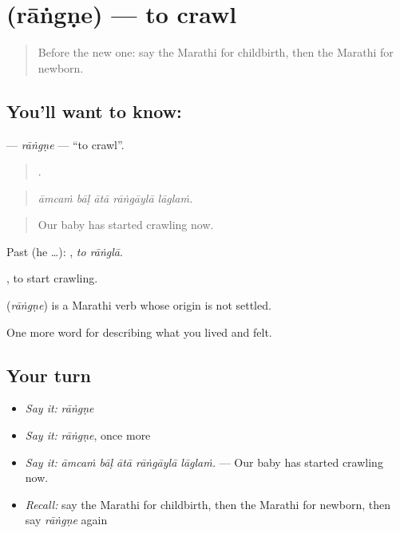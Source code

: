 \section[\texorpdfstring{\mr{रांगणे} (rāṅgṇe)}{रांगणे (rāṅgṇe)}]{ (rāṅgṇe) — to crawl}

\label{lesson:MR-C499-rangne}



\begin{quote}
Before the new one: say the Marathi for childbirth, then the Marathi for newborn.
\end{quote}

\subsection*{You'll want to know: }
\textbf{} — \emph{rāṅgṇe} — \textquotedblleft{}to crawl\textquotedblright{}.

\begin{quote}
    .
\end{quote}

\begin{quote}
\emph{āmcaṁ bāḷ ātā rāṅgāylā lāglaṁ.}
\end{quote}

\begin{quote}
Our baby has started crawling now.
\end{quote}

Past (he …):  , \emph{to rāṅglā}.

 , to start crawling.

\begin{cousinweb}
\textbf{} (\emph{rāṅgṇe}) is a Marathi verb whose origin is not settled.
\end{cousinweb}

\begin{grammarlens}[title={What you've built}]
One more word for describing what you lived and felt.
\end{grammarlens}

\subsection*{Your turn}
\begin{itemize}
\raggedright
  \item \emph{Say it:} \emph{rāṅgṇe}
  \item \emph{Say it:} \emph{rāṅgṇe}, once more
  \item \emph{Say it:} \emph{āmcaṁ bāḷ ātā rāṅgāylā lāglaṁ.} — Our baby has started crawling now.
  \item \emph{Recall:} say the Marathi for childbirth, then the Marathi for newborn, then say \emph{rāṅgṇe} again
\end{itemize}

